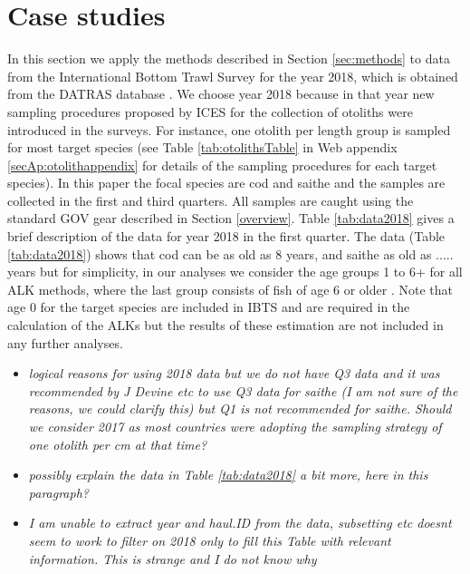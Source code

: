 \documentclass[a4paper 12pt]{article}
\numberwithin{equation}{section}
\begin{document}
\section{Case studies}
\label{sec:data}
In this section we apply the methods described in Section \ref{sec:methods} to data from the International Bottom Trawl Survey for the year 2018, which is obtained from the DATRAS database \citep{datras}. We choose year 2018 because in that year new sampling procedures proposed by ICES for the collection of otoliths were introduced in the surveys. For instance, one otolith per length group is sampled for most target species (see Table \ref{tab:otolithsTable} in Web appendix \ref{secAp:otolithappendix} for details of the sampling procedures for each target species). In this paper the focal species are cod and saithe and the samples are collected in the first and third quarters. All samples are caught using the standard GOV gear described in Section \ref{overview}. Table \ref{tab:data2018} gives a brief description of the data for year 2018 in the first quarter. The data (Table \ref{tab:data2018}) shows that cod can be as old as 8 years, and saithe as old as ..... years but for simplicity, in our analyses we consider the age groups 1 to 6+ for all ALK methods, where the last group consists of fish of age 6 or older . Note that age 0 for the target species are included in IBTS and are required in the calculation of the ALKs but the results of these estimation are not included in any further analyses.

\begin{itemize}
\item \emph{logical reasons for using 2018 data but we do not have Q3 data and it was recommended by J Devine etc to use Q3 data for saithe (I am not sure of the reasons, we could clarify this) but Q1 is not recommended for saithe. Should we consider 2017 as most countries were adopting the sampling strategy of one otolith per cm at that time?}
\item \emph{possibly explain the data in Table \ref{tab:data2018} a bit more, here in this paragraph?}
\item \emph{I am unable to extract year and haul.ID from the data, subsetting etc doesnt seem to work to filter on 2018 only to fill this Table with relevant information. This is strange and I do not know why}
\end{itemize}
\end{document}
